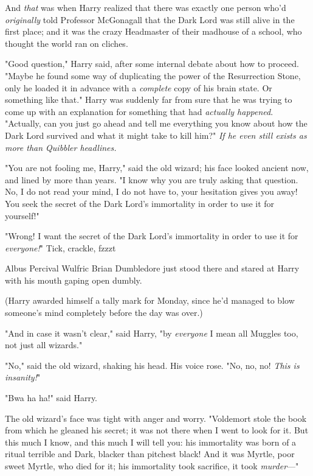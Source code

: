 And \emph{that} was when Harry realized that there was exactly one person who'd
\emph{originally} told Professor McGonagall that the Dark Lord was still alive
in the first place; and it was the crazy Headmaster of their madhouse of a
school, who thought the world ran on cliches.

"Good question," Harry said, after some internal debate about how to proceed.
"Maybe he found some way of duplicating the power of the Resurrection Stone,
only he loaded it in advance with a \emph{complete} copy of his brain state. Or
something like that." Harry was suddenly far from sure that he was trying to
come up with an explanation for something that had \emph{actually happened}.
"Actually, can you just go ahead and tell me everything you know about how the
Dark Lord survived and what it might take to kill him?"  \emph{If he even still
exists as more than Quibbler headlines.}

"You are not fooling me, Harry," said the old wizard; his face looked ancient
now, and lined by more than years. "I know why you are truly asking that
question. No, I do not read your mind, I do not have to, your hesitation gives
you away! You seek the secret of the Dark Lord's immortality in order to use it
for yourself!"

"Wrong! I want the secret of the Dark Lord's immortality in order to use it for
\emph{everyone!}"
\sbreak
Tick, crackle, fzzzt{\el}

Albus Percival Wulfric Brian Dumbledore just stood there and stared at Harry
with his mouth gaping open dumbly.

(Harry awarded himself a tally mark for Monday, since he'd managed to blow
someone's mind completely before the day was over.)

"And in case it wasn't clear," said Harry, "by \emph{everyone} I mean all
Muggles too, not just all wizards."

"No," said the old wizard, shaking his head. His voice rose. "No, no, no!
\emph{This is insanity!}"

"Bwa ha ha!" said Harry.

The old wizard's face was tight with anger and worry. "Voldemort stole the book
from which he gleaned his secret; it was not there when I went to look for it.
But this much I know, and this much I will tell you: his immortality was born
of a ritual terrible and Dark, blacker than pitchest black! And it was Myrtle,
poor sweet Myrtle, who died for it; his immortality took sacrifice, it took
\emph{murder}\mbox{---}"

